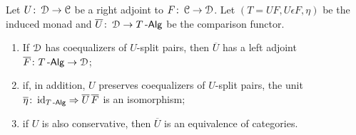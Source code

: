 \documentclass[a4paper,11pt,oneside,openany]{scrbook}
\begin{document}
\begin{teo}[Beck]\label{Beck} Let $U\colon\operatorname{\mathcal{D}}\to\operatorname{\mathcal{C}}$ be a right adjoint to $F\colon\operatorname{\mathcal{C}}\to\operatorname{\mathcal{D}}$. Let $(T=UF, U\epsilon F, \eta)$ be the induced monad and $\overline{U}\colon\operatorname{\mathcal{D}}\to T\operatorname{-\mathsf{Alg}}$ be the comparison functor. 
	\begin{enumerate}
		\item If $\operatorname{\mathcal{D}}$ has coequalizers of $U$-split pairs, then $\overline{U}$ has a left adjoint $\overline{F}\colon T\operatorname{-\mathsf{Alg}}\to\operatorname{\mathcal{D}}$;
		\item if, in addition, $U$ preserves coequalizers of $U$-split pairs, the unit $\overline{\eta}\colon\operatorname{id}_{T\operatorname{-\mathsf{Alg}}}\Rightarrow\overline{U}\hspace{.5mm} \overline{F}$ is an isomorphism;
		\item if $U$ is also conservative, then $\overline{U}$ is an equivalence of categories.
	\end{enumerate}
	\end{teo}
\end{document}
